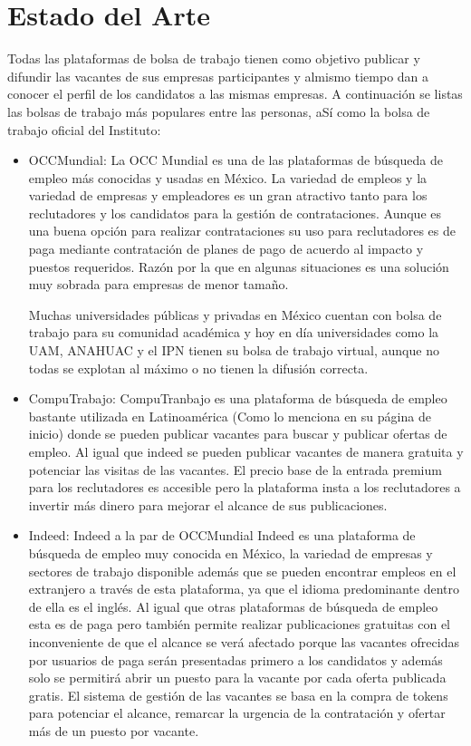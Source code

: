 \section{Estado del Arte}
Todas las plataformas de bolsa de trabajo tienen como objetivo publicar y difundir las vacantes de sus empresas participantes
y almismo tiempo dan a conocer el perfil de los candidatos a las mismas empresas.
\newline
A continuación se listas las bolsas de trabajo más populares entre las personas, aSí como  la bolsa de trabajo
oficial del Instituto:
\begin{itemize}
    \item OCCMundial: La OCC Mundial es una de las plataformas de búsqueda de empleo más conocidas y usadas en México. La variedad 
    de empleos y la variedad de empresas y empleadores es un gran atractivo tanto para los reclutadores y los candidatos para la 
    gestión de contrataciones. Aunque es una buena opción para realizar contrataciones su uso para reclutadores es de paga mediante 
    contratación de planes de pago de acuerdo al impacto y puestos requeridos. Razón por la que en algunas situaciones es una 
    solución muy sobrada para empresas de menor tamaño.

    Muchas universidades públicas y privadas en México cuentan con bolsa de trabajo para su comunidad académica y hoy en día 
    universidades como la UAM, ANAHUAC y el IPN tienen su bolsa de trabajo virtual, aunque no todas se explotan al máximo o no 
    tienen la difusión correcta.
    
    \item CompuTrabajo: CompuTranbajo es una plataforma de búsqueda de empleo bastante utilizada en Latinoamérica (Como lo menciona 
    en su página de inicio) donde se pueden publicar vacantes para buscar y publicar ofertas de empleo. Al igual que indeed se 
    pueden publicar vacantes de manera gratuita y potenciar las visitas de las vacantes. El precio base de la entrada premium para 
    los reclutadores es accesible pero la plataforma insta a los reclutadores a invertir más dinero para mejorar el alcance de sus 
    publicaciones.
    
    \item Indeed: Indeed a la par de OCCMundial Indeed es una plataforma de búsqueda de empleo muy conocida en México, la variedad 
    de empresas y sectores de trabajo disponible además que se pueden encontrar empleos en el extranjero a través de esta 
    plataforma, ya que el idioma predominante dentro de ella es el inglés. Al igual que otras plataformas de búsqueda de empleo 
    esta es de paga pero también permite realizar publicaciones gratuitas con el inconveniente de que el alcance se verá afectado 
    porque las vacantes ofrecidas por usuarios de paga serán presentadas primero a los candidatos y además solo se permitirá abrir 
    un puesto para la vacante por cada oferta publicada gratis. El sistema de gestión de las vacantes se basa en la compra de 
    tokens para potenciar el alcance, remarcar la urgencia de la contratación y ofertar más de un puesto por vacante.
    

\end{itemize}
